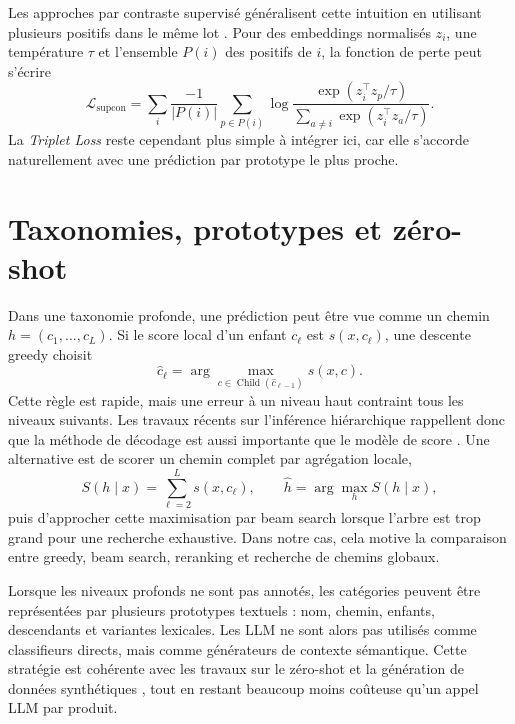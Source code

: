 \documentclass[12pt,a4paper]{report}
\begin{document}
Les approches par contraste supervisé généralisent cette intuition en utilisant plusieurs positifs dans le même lot \cite{khosla2020supcon,gao2021simcse}. Pour des embeddings normalisés $z_i$, une température $\tau$ et l'ensemble $P(i)$ des positifs de $i$, la fonction de perte peut s'écrire
\begin{equation}
    \mathcal{L}_{\text{supcon}}
    =
    \sum_i
    \frac{-1}{|P(i)|}
    \sum_{p \in P(i)}
    \log
    \frac{\exp(z_i^\top z_p/\tau)}
    {\sum_{a \neq i}\exp(z_i^\top z_a/\tau)}.
\end{equation}
La \textit{Triplet Loss} reste cependant plus simple à intégrer ici, car elle s'accorde naturellement avec une prédiction par prototype le plus proche.

\section{Taxonomies, prototypes et zéro-shot}
\label{sec:lit-taxonomies}
\label{sec:lit-zero-shot-enrichment}

Dans une taxonomie profonde, une prédiction peut être vue comme un chemin $h=(c_1,\ldots,c_L)$. Si le score local d'un enfant $c_\ell$ est $s(x,c_\ell)$, une descente greedy choisit
\begin{equation}
    \hat{c}_{\ell}
    =
    \arg\max_{c\in \operatorname{Child}(\hat{c}_{\ell-1})}
    s(x,c).
\end{equation}
Cette règle est rapide, mais une erreur à un niveau haut contraint tous les niveaux suivants. Les travaux récents sur l'inférence hiérarchique rappellent donc que la méthode de décodage est aussi importante que le modèle de score \cite{plaud2024revisiting}. Une alternative est de scorer un chemin complet par agrégation locale,
\begin{equation}
    S(h\mid x)
    =
    \sum_{\ell=2}^{L} s(x,c_\ell),
    \qquad
    \hat{h}=\arg\max_h S(h\mid x),
\end{equation}
puis d'approcher cette maximisation par beam search lorsque l'arbre est trop grand pour une recherche exhaustive. Dans notre cas, cela motive la comparaison entre greedy, beam search, reranking et recherche de chemins globaux.

Lorsque les niveaux profonds ne sont pas annotés, les catégories peuvent être représentées par plusieurs prototypes textuels : nom, chemin, enfants, descendants et variantes lexicales. Les LLM ne sont alors pas utilisés comme classifieurs directs, mais comme générateurs de contexte sémantique. Cette stratégie est cohérente avec les travaux sur le zéro-shot et la génération de données synthétiques \cite{brown2020language,meng2022supergen}, tout en restant beaucoup moins coûteuse qu'un appel LLM par produit.
\end{document}
